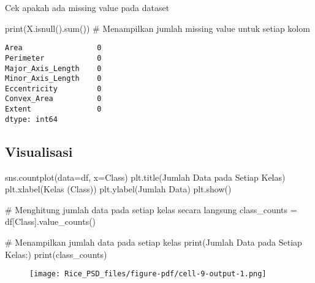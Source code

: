 \documentclass[
  letterpaper,
]{krantz}
\makeatletter
\newenvironment{Shaded}{\begin{snugshade}}{\end{snugshade}}
\newcommand{\BuiltInTok}[1]{\textcolor[rgb]{0.00,0.23,0.31}{#1}}
\newcommand{\CommentTok}[1]{\textcolor[rgb]{0.37,0.37,0.37}{#1}}
\newcommand{\NormalTok}[1]{\textcolor[rgb]{0.00,0.23,0.31}{#1}}
\newcommand{\OperatorTok}[1]{\textcolor[rgb]{0.37,0.37,0.37}{#1}}
\newcommand{\StringTok}[1]{\textcolor[rgb]{0.13,0.47,0.30}{#1}}
\newenvironment{kframe}{%
\medskip{}
\setlength{\fboxsep}{.8em}
 \def\at@end@of@kframe{}%
 \ifinner\ifhmode%
  \def\at@end@of@kframe{\end{minipage}}%
  \begin{minipage}{\columnwidth}%
 \fi\fi%
 \def\FrameCommand##1{\hskip\@totalleftmargin \hskip-\fboxsep
 \colorbox{shadecolor}{##1}\hskip-\fboxsep
     \hskip-\linewidth \hskip-\@totalleftmargin \hskip\columnwidth}%
 \MakeFramed {\advance\hsize-\width
   \@totalleftmargin\z@ \linewidth\hsize
   \@setminipage}}%
 {\par\unskip\endMakeFramed%
 \at@end@of@kframe}
\renewenvironment{Shaded}{\begin{kframe}}{\end{kframe}}
\makeatother
\begin{document}
Cek apakah ada missing value pada dataset

\begin{Shaded}
\begin{Highlighting}[]
\BuiltInTok{print}\NormalTok{(X.isnull().}\BuiltInTok{sum}\NormalTok{())  }\CommentTok{\# Menampilkan jumlah missing value untuk setiap kolom}
\end{Highlighting}
\end{Shaded}

\begin{verbatim}
Area                 0
Perimeter            0
Major_Axis_Length    0
Minor_Axis_Length    0
Eccentricity         0
Convex_Area          0
Extent               0
dtype: int64
\end{verbatim}

\hypertarget{visualisasi}{%
\subsection{Visualisasi}\label{visualisasi}}

\begin{Shaded}
\begin{Highlighting}[]
\NormalTok{sns.countplot(data}\OperatorTok{=}\NormalTok{df, x}\OperatorTok{=}\StringTok{\textquotesingle{}Class\textquotesingle{}}\NormalTok{)}
\NormalTok{plt.title(}\StringTok{\textquotesingle{}Jumlah Data pada Setiap Kelas\textquotesingle{}}\NormalTok{)}
\NormalTok{plt.xlabel(}\StringTok{\textquotesingle{}Kelas (Class)\textquotesingle{}}\NormalTok{)}
\NormalTok{plt.ylabel(}\StringTok{\textquotesingle{}Jumlah Data\textquotesingle{}}\NormalTok{)}
\NormalTok{plt.show()}

\CommentTok{\# Menghitung jumlah data pada setiap kelas secara langsung}
\NormalTok{class\_counts }\OperatorTok{=}\NormalTok{ df[}\StringTok{\textquotesingle{}Class\textquotesingle{}}\NormalTok{].value\_counts()}

\CommentTok{\# Menampilkan jumlah data pada setiap kelas}
\BuiltInTok{print}\NormalTok{(}\StringTok{\textquotesingle{}Jumlah Data pada Setiap Kelas:\textquotesingle{}}\NormalTok{)}
\BuiltInTok{print}\NormalTok{(class\_counts)}
\end{Highlighting}
\end{Shaded}

\begin{figure}[H]

{\centering \texttt{[image: Rice\_PSD\_files/figure-pdf/cell-9-output-1.png]}

}

\end{figure}
\end{document}
